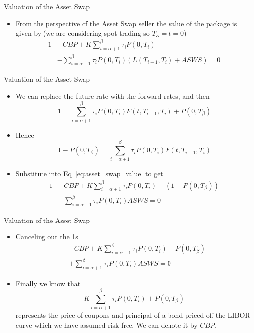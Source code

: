 \documentclass{beamer}
\begin{document}
\begin{frame}{Valuation of the Asset Swap}
	\begin{itemize}
		\item From the perspective of the Asset Swap seller the value of the package is given by (we are considering spot trading so $T_\alpha = t = 0$)
		\begin{equation}
			\begin{aligned}
				1&-\overline{CBP}+K\sum_{i=\alpha+1}^{\beta}\tau_i P(0,T_i) \\
				&-\sum_{i=\alpha+1}^{\beta}\tau_i P(0,T_i)(L(T_{i-1},T_i)+ASWS)=0
			\end{aligned}
			\label{eq:asset_swap_value}
		\end{equation}
	\end{itemize}
\end{frame}

\begin{frame}{Valuation of the Asset Swap}
	\begin{itemize}
		\item We can replace the future rate with the forward rates, and then
		\begin{equation*}
			1 = \sum_{i=\alpha+1}^{\beta}\tau_i P(0,T_i)F(t,T_{i-1},T_i)+P(0,T_\beta)
		\end{equation*}
		\item Hence 
		\begin{equation*}
			1 - P(0,T_\beta) = \sum_{i=\alpha+1}^{\beta}\tau_i P(0,T_i)F(t,T_{i-1},T_i)
		\end{equation*}
		\item Substitute into Eq~\ref{eq:asset_swap_value} to get
		\begin{equation*}
			\begin{aligned}
				1&-\overline{CBP}+K\sum_{i=\alpha+1}^{\beta}\tau_i P(0,T_i) -(1-P(0,T_\beta)) \\
				&+ \sum_{i=\alpha+1}^{\beta}\tau_i P(0,T_i)ASWS=0
			\end{aligned}
		\end{equation*}
	\end{itemize}
\end{frame}

\begin{frame}{Valuation of the Asset Swap}
	\begin{itemize}
		\item Canceling out the 1s
		\begin{equation*}
			\begin{aligned}
				&-\overline{CBP}+K\sum_{i=\alpha+1}^{\beta}\tau_i P(0,T_i) +P(0,T_\beta) \\
				& + \sum_{i=\alpha+1}^{\beta}\tau_i P(0,T_i)ASWS=0
			\end{aligned}
		\end{equation*}
		\item Finally we know that
		\begin{equation*}
			K\sum_{i=\alpha+1}^{\beta}\tau_i P(0,T_i) + P(0,T_\beta)
		\end{equation*}
		represents the price of coupons and principal of a bond priced off the LIBOR curve which we have assumed risk-free. We can denote it by $CBP$.
	\end{itemize}
\end{frame}
\end{document}
